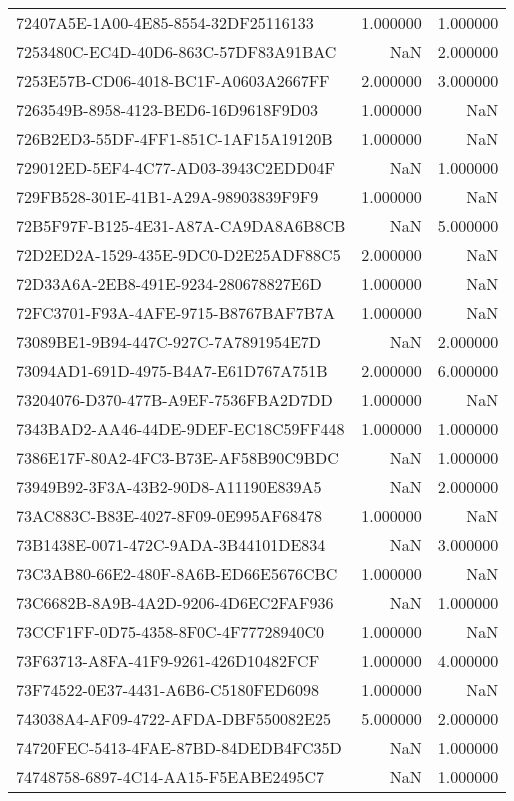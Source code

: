 \begin{tabular}{lrr}
72407A5E-1A00-4E85-8554-32DF25116133 & 1.000000 & 1.000000 \\
7253480C-EC4D-40D6-863C-57DF83A91BAC & NaN & 2.000000 \\
7253E57B-CD06-4018-BC1F-A0603A2667FF & 2.000000 & 3.000000 \\
7263549B-8958-4123-BED6-16D9618F9D03 & 1.000000 & NaN \\
726B2ED3-55DF-4FF1-851C-1AF15A19120B & 1.000000 & NaN \\
729012ED-5EF4-4C77-AD03-3943C2EDD04F & NaN & 1.000000 \\
729FB528-301E-41B1-A29A-98903839F9F9 & 1.000000 & NaN \\
72B5F97F-B125-4E31-A87A-CA9DA8A6B8CB & NaN & 5.000000 \\
72D2ED2A-1529-435E-9DC0-D2E25ADF88C5 & 2.000000 & NaN \\
72D33A6A-2EB8-491E-9234-280678827E6D & 1.000000 & NaN \\
72FC3701-F93A-4AFE-9715-B8767BAF7B7A & 1.000000 & NaN \\
73089BE1-9B94-447C-927C-7A7891954E7D & NaN & 2.000000 \\
73094AD1-691D-4975-B4A7-E61D767A751B & 2.000000 & 6.000000 \\
73204076-D370-477B-A9EF-7536FBA2D7DD & 1.000000 & NaN \\
7343BAD2-AA46-44DE-9DEF-EC18C59FF448 & 1.000000 & 1.000000 \\
7386E17F-80A2-4FC3-B73E-AF58B90C9BDC & NaN & 1.000000 \\
73949B92-3F3A-43B2-90D8-A11190E839A5 & NaN & 2.000000 \\
73AC883C-B83E-4027-8F09-0E995AF68478 & 1.000000 & NaN \\
73B1438E-0071-472C-9ADA-3B44101DE834 & NaN & 3.000000 \\
73C3AB80-66E2-480F-8A6B-ED66E5676CBC & 1.000000 & NaN \\
73C6682B-8A9B-4A2D-9206-4D6EC2FAF936 & NaN & 1.000000 \\
73CCF1FF-0D75-4358-8F0C-4F77728940C0 & 1.000000 & NaN \\
73F63713-A8FA-41F9-9261-426D10482FCF & 1.000000 & 4.000000 \\
73F74522-0E37-4431-A6B6-C5180FED6098 & 1.000000 & NaN \\
743038A4-AF09-4722-AFDA-DBF550082E25 & 5.000000 & 2.000000 \\
74720FEC-5413-4FAE-87BD-84DEDB4FC35D & NaN & 1.000000 \\
74748758-6897-4C14-AA15-F5EABE2495C7 & NaN & 1.000000 \\

\end{tabular}
